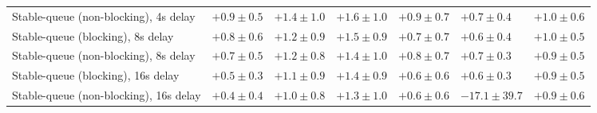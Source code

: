 \begin{table}[H]
{\begin{tabular}{l w{c}{5.0em} w{c}{5.0em} w{c}{5.0em} w{c}{5.0em} w{c}{5.0em} w{c}{5.0em}}
Stable-queue (non-blocking), 4s delay & $+0.9\pm0.5$ & $+1.4\pm1.0$ & $+1.6\pm1.0$ & $+0.9\pm0.7$ & $+0.7\pm0.4$ & $+1.0\pm0.6$ \\
Stable-queue (blocking), 8s delay & $+0.8\pm0.6$ & $+1.2\pm0.9$ & $+1.5\pm0.9$ & $+0.7\pm0.7$ & $+0.6\pm0.4$ & $+1.0\pm0.5$ \\
Stable-queue (non-blocking), 8s delay & $+0.7\pm0.5$ & $+1.2\pm0.8$ & $+1.4\pm1.0$ & $+0.8\pm0.7$ & $+0.7\pm0.3$ & $+0.9\pm0.5$ \\
Stable-queue (blocking), 16s delay & $+0.5\pm0.3$ & $+1.1\pm0.9$ & $+1.4\pm0.9$ & $+0.6\pm0.6$ & $+0.6\pm0.3$ & $+0.9\pm0.5$ \\
Stable-queue (non-blocking), 16s delay & $+0.4\pm0.4$ & $+1.0\pm0.8$ & $+1.3\pm1.0$ & $+0.6\pm0.6$ & $-17.1\pm39.7$ & $+0.9\pm0.6$ \\
\bottomrule
\end{tabular}%
}
\end{table}
